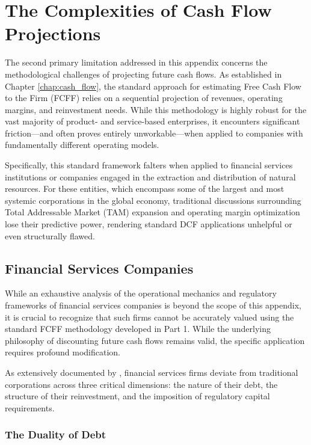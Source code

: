 \section*{The Complexities of Cash Flow Projections}

The second primary limitation addressed in this appendix concerns the methodological challenges of projecting future cash flows. As established in Chapter \ref{chap:cash_flow}, the standard approach for estimating Free Cash Flow to the Firm (FCFF) relies on a sequential projection of revenues, operating margins, and reinvestment needs. While this methodology is highly robust for the vast majority of product- and service-based enterprises, it encounters significant friction—and often proves entirely unworkable—when applied to companies with fundamentally different operating models. 

Specifically, this standard framework falters when applied to financial services institutions or companies engaged in the extraction and distribution of natural resources. For these entities, which encompass some of the largest and most systemic corporations in the global economy, traditional discussions surrounding Total Addressable Market (TAM) expansion and operating margin optimization lose their predictive power, rendering standard DCF applications unhelpful or even structurally flawed.

\subsection*{Financial Services Companies}

While an exhaustive analysis of the operational mechanics and regulatory frameworks of financial services companies is beyond the scope of this appendix, it is crucial to recognize that such firms cannot be accurately valued using the standard FCFF methodology developed in Part 1. While the underlying philosophy of discounting future cash flows remains valid, the specific application requires profound modification.

As extensively documented by \textcite{damodaran2025investment}, financial services firms deviate from traditional corporations across three critical dimensions: the nature of their debt, the structure of their reinvestment, and the imposition of regulatory capital requirements.

\subsubsection*{The Duality of Debt}

